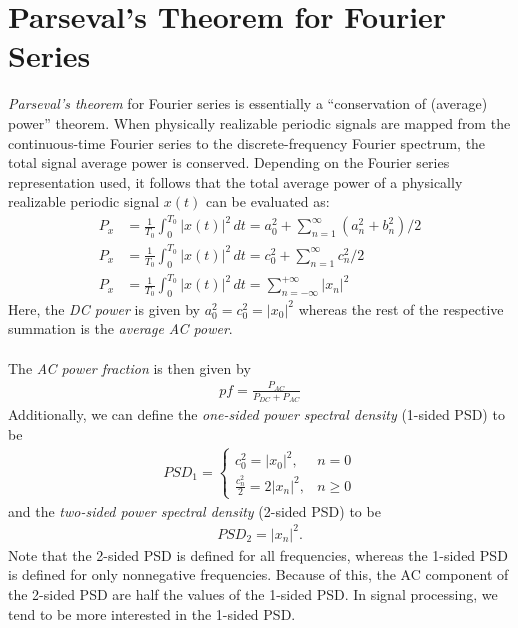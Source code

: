 \documentclass{report}
\begin{document}
\section{Parseval's Theorem for Fourier Series}
\emph{Parseval's theorem} for Fourier series is essentially a ``conservation of (average) power'' theorem. When physically realizable periodic signals are mapped from the continuous-time Fourier series to the discrete-frequency Fourier spectrum, the total 
signal average power is conserved. Depending on the Fourier series representation used, it follows that the total average power of a physically realizable periodic signal $x(t)$ can be evaluated as:
\begin{align}
    P_x &= \frac{1}{T_0}\int_{0}^{T_0} |x(t)|^2 \,dt = a_0^2 +\sum_{n=1}^{\infty}(a_n^2 + b_n^2)/2 \\
    P_x &= \frac{1}{T_0}\int_{0}^{T_0} |x(t)|^2 \,dt = c_0^2 +\sum_{n=1}^{\infty}c_n^2/2 \\
    P_x &= \frac{1}{T_0}\int_{0}^{T_0} |x(t)|^2 \,dt = \sum_{n=-\infty}^{+\infty}|x_n|^2
\end{align}
Here, the \emph{DC power} is given by $a_0^2 = c_0^2 = |x_0|^2$ whereas the rest of the respective summation is the \emph{average AC power}. 
\\ \\
The \emph{AC power fraction} is then given by 
\begin{align}
    pf=\frac{P_{AC}}{P_{DC} + P_{AC}}
\end{align}
Additionally, we can define the \emph{one-sided power spectral density} (1-sided PSD) to be 
\begin{align}
    PSD_1 = 
    \begin{cases}
        c_0^2 = |x_0|^2, & n=0 \\
        \frac{c_n^2}{2} = 2|x_n|^2, & n\geq 0
    \end{cases}
\end{align}
and the \emph{two-sided power spectral density} (2-sided PSD) to be 
\begin{align}
    PSD_2 = |x_n|^2.
\end{align}
Note that the 2-sided PSD is defined for all frequencies, whereas the 1-sided PSD is defined for only nonnegative frequencies. 
Because of this, the AC component of the 2-sided PSD are half the values of the 1-sided PSD. In signal processing, we tend to be more interested in the 1-sided PSD.
\end{document}

